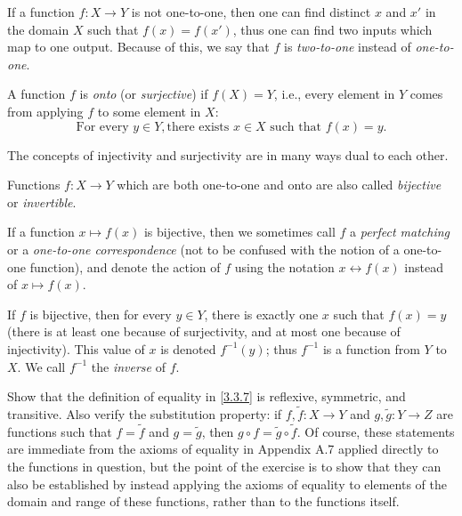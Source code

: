 \setcounter{thm}{15}
\begin{rmk}\label{3.3.16}
  If a function \(f : X \to Y\) is not one-to-one, then one can find distinct \(x\) and \(x'\) in the domain \(X\) such that \(f(x) = f(x')\), thus one can find two inputs which map to one output.
  Because of this, we say that \(f\) is \emph{two-to-one} instead of \emph{one-to-one}.
\end{rmk}

\begin{defn}\label{3.3.17}
  A function \(f\) is \emph{onto} (or \emph{surjective}) if \(f(X) = Y\), i.e., every element in \(Y\) comes from applying \(f\) to some element in \(X\):
  \[
    \text{For every } y \in Y, \text{there exists } x \in X \text{ such that } f(x) = y.
  \]
\end{defn}

\setcounter{thm}{18}
\begin{rmk}\label{3.3.19}
  The concepts of injectivity and surjectivity are in many ways dual to each other.
\end{rmk}

\begin{defn}\label{3.3.20}
  Functions \(f : X \to Y\) which are both one-to-one and onto are also called \emph{bijective} or \emph{invertible}.
\end{defn}

\setcounter{thm}{22}
\begin{rmk}\label{3.3.23}
  If a function \(x \mapsto f(x)\) is bijective, then we sometimes call \(f\) a \emph{perfect matching} or a \emph{one-to-one correspondence} (not to be confused with the notion of a one-to-one function), and denote the action of \(f\) using the notation \(x \leftrightarrow f(x)\) instead of \(x \mapsto f(x)\).
\end{rmk}

\begin{note}
  If \(f\) is bijective, then for every \(y \in Y\), there is exactly one \(x\) such that \(f(x) = y\) (there is at least one because of surjectivity, and at most one because of injectivity).
  This value of \(x\) is denoted \(f^{-1}(y)\); thus \(f^{-1}\) is a function from \(Y\) to \(X\).
  We call \(f^{-1}\) the \emph{inverse} of \(f\).
\end{note}

\exercisesection

\begin{ex}\label{ex:3.3.1}
  Show that the definition of equality in \cref{3.3.7} is reflexive, symmetric, and transitive.
  Also verify the substitution property: if \(f, \tilde{f} : X \to Y\) and \(g, \tilde{g} : Y \to Z\) are functions such that \(f = \tilde{f}\) and \(g = \tilde{g}\), then \(g \circ f = \tilde{g} \circ \tilde{f}\).
  Of course, these statements are immediate from the axioms of equality in Appendix A.7 applied directly to the functions in question, but the point of the exercise is to show that they can also be established by instead applying the axioms of equality to elements of the domain and range of these functions, rather than to the functions itself.
\end{ex}

